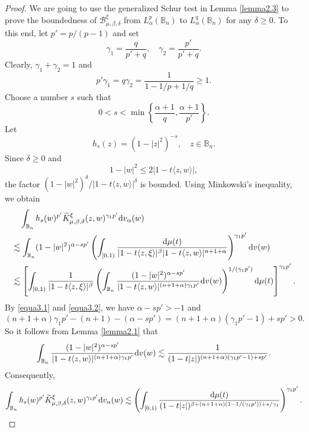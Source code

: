 \documentclass[preprint,12pt,times]{elsarticle}
\theoremstyle{definition}
\theoremstyle{remark}
\numberwithin{equation}{section}
\begin{document}
\begin{proof}
We are going to use the generalized Schur test in Lemma \ref{lemma2.3} to prove the boundedness of $\mathcal{B}_{\mu,\beta,\delta}^{\xi}$ from $L_{\alpha}^p(\mathbb{B}_n)$ to $L_{\alpha}^q(\mathbb{B}_n)$ for any $\delta\geq 0$. To this end, let $p'=p/(p-1)$ and set 
\begin{equation*}
\gamma_1=\frac{q}{p'+q},\quad \gamma_2=\frac{p'}{p'+q}.
\end{equation*}
Clearly, $\gamma_1+\gamma_2=1$ and
\begin{equation}\label{equa3.1}
p'\gamma_1=q\gamma_2=\frac{1}{1-1/p+1/q}\geq 1.
\end{equation}
Choose a number $s$ such that 
\begin{equation}\label{equa3.2}
    0<s<\min\left\{\frac{\alpha+1}{q},\frac{\alpha+1}{p'}\right\}.
\end{equation}
Let 
\[
    h_s(z)=(1-|z|^2)^{-s},\quad z\in\mathbb B_n.
\]
 Since $\delta\geq0$ and
\[
    1-|w|^2\leq2|1-t\langle z,w\rangle|,
\]
the factor $(1-|w|^2)^\delta/|1-t\langle z,w\rangle|^\delta$ is bounded.  Using Minkowski's inequality, we obtain
\begin{align*}
&\quad \int_{\mathbb{B}_n}h_s(w)^{p'}\widetilde{K}_{\mu,\beta,\delta}^{\xi}(z,w)^{\gamma_1p'}{\rm d}v_{\alpha}(w)\\
&\lesssim \int_{\mathbb{B}_n}(1-|w|^2)^{\alpha-sp'}\left(\int_{[0,1)}\frac{{\rm d}\mu(t)}{|1-t\langle z,\xi\rangle|^{\beta}|1-t\langle z,w\rangle|^{n+1+\alpha}}\right)^{\gamma_1p'}{\rm d}v(w)\\
&\lesssim \left[\int_{[0,1)}\frac{1}{|1-t\langle z,\xi\rangle|^{\beta}}\left(\int_{\mathbb{B}_n}\frac{(1-|w|^2)^{\alpha-sp'}}{|1-t\langle z,w\rangle|^{(n+1+\alpha)\gamma_1p'}}{\rm d}v(w)\right)^{1/(\gamma_1p')}{\rm d}\mu(t)\right]^{\gamma_1p'}.
\end{align*}
By \eqref{equa3.1} and \eqref{equa3.2}, we have $\alpha-sp'>-1$ and 
\[
    (n+1+\alpha)\gamma_1p'-(n+1)-(\alpha-sp')=(n+1+\alpha)(\gamma_1p'-1)+sp'>0.
\]
So it follows from Lemma \ref{lemma2.1} that
\begin{align*}
\int_{\mathbb{B}_n}\frac{(1-|w|^2)^{\alpha-sp'}}{|1-t\langle z,w\rangle|^{(n+1+\alpha)\gamma_1p'}}{\rm d}v(w)\lesssim \frac{1}{(1-t|z|)^{(n+1+\alpha)(\gamma_1p'-1)+sp'}}.
\end{align*}
Consequently, 
\begin{align*}
\int_{\mathbb{B}_n}h_s(w)^{p'}\widetilde{K}_{\mu,\beta,\delta}^{\xi}(z,w)^{\gamma_1p'}{\rm d}v_{\alpha}(w)\lesssim \left(\int_{[0,1)}\frac{{\rm d}\mu(t)}{(1-t|z|)^{\beta+(n+1+\alpha)(1-1/(\gamma_1p'))+s/\gamma_1}}\right)^{\gamma_1p'}.

\end{align*}
\end{proof}
\end{document}
